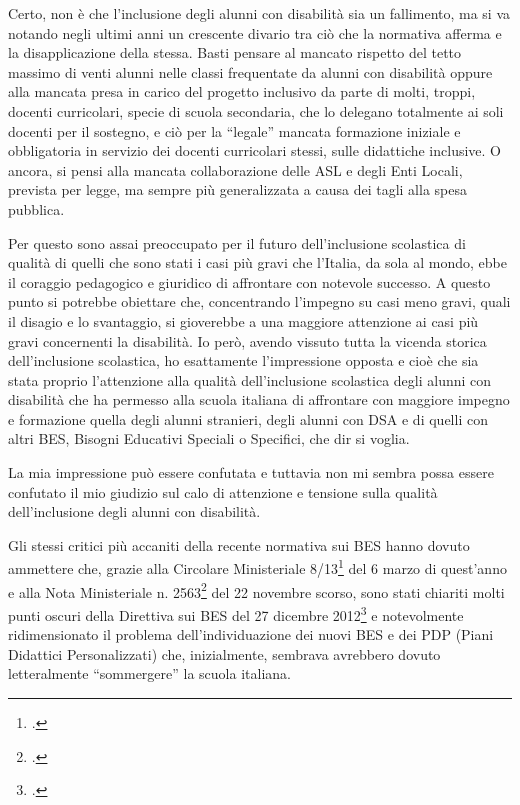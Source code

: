 Certo, non è che l'inclusione degli alunni con disabilità sia un fallimento, ma si va notando negli ultimi anni un crescente divario tra ciò che la normativa afferma e la disapplicazione della stessa. Basti pensare al mancato rispetto del tetto massimo di venti alunni nelle classi frequentate da alunni con disabilità oppure alla mancata presa in carico del progetto inclusivo da parte di molti, troppi, docenti curricolari, specie di scuola secondaria, che lo delegano totalmente ai soli docenti per il sostegno, e ciò per la “legale” mancata formazione iniziale e obbligatoria in servizio dei docenti curricolari stessi, sulle didattiche inclusive. O ancora, si pensi alla mancata collaborazione delle ASL e degli Enti Locali, prevista per legge, ma sempre più generalizzata a causa dei tagli alla spesa pubblica.

Per questo sono assai preoccupato per il futuro dell'inclusione scolastica di qualità di quelli che sono stati i casi più gravi che l'Italia, da sola al mondo, ebbe il coraggio pedagogico e giuridico di affrontare con notevole successo.
A questo punto si potrebbe obiettare che, concentrando l'impegno su casi meno gravi, quali il disagio e lo svantaggio, si gioverebbe a una maggiore attenzione ai casi più gravi concernenti la disabilità. Io però, avendo vissuto tutta la vicenda storica dell'inclusione scolastica, ho esattamente l'impressione opposta e cioè che sia stata proprio l'attenzione alla qualità dell'inclusione scolastica degli alunni con disabilità che ha permesso alla scuola italiana di affrontare con maggiore impegno e formazione quella degli alunni stranieri, degli alunni con DSA e di quelli con altri BES, Bisogni Educativi Speciali o Specifici, che dir si voglia.

La mia impressione può essere confutata e tuttavia non mi sembra possa essere confutato il mio giudizio sul calo di attenzione e tensione sulla qualità dell'inclusione degli alunni con disabilità.

Gli stessi critici più accaniti della recente normativa sui BES hanno dovuto ammettere che, grazie alla Circolare Ministeriale 8/13\footcite{cm8_2013} del 6 marzo di quest'anno e alla Nota Ministeriale n. 2563\footcite{Nota_2563_2013} del 22 novembre scorso, sono stati chiariti molti punti oscuri della Direttiva sui BES del 27 dicembre 2012\footcite{dir27Dic2012} e notevolmente ridimensionato il problema dell'individuazione dei nuovi BES e dei PDP (Piani Didattici Personalizzati) che, inizialmente, sembrava avrebbero dovuto letteralmente “sommergere” la scuola italiana.

